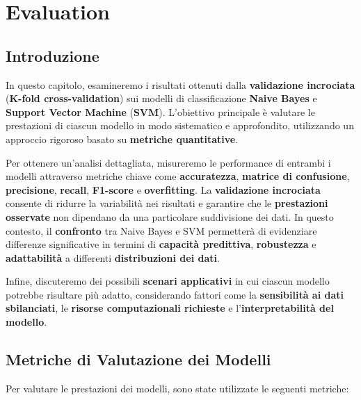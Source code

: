 \chapter{Evaluation}

\section{Introduzione}
In questo capitolo, esamineremo i risultati ottenuti dalla \textbf{validazione incrociata} (\textbf{K-fold cross-validation}) sui modelli di classificazione \textbf{Naive Bayes} e \textbf{Support Vector Machine} (\textbf{SVM}). L'obiettivo principale è valutare le prestazioni di ciascun modello in modo sistematico e approfondito, utilizzando un approccio rigoroso basato su \textbf{metriche quantitative}.

Per ottenere un'analisi dettagliata, misureremo le performance di entrambi i modelli attraverso metriche chiave come \textbf{accuratezza}, \textbf{matrice di confusione}, \textbf{precisione}, \textbf{recall}, \textbf{F1-score} e \textbf{overfitting}. La \textbf{validazione incrociata} consente di ridurre la variabilità nei risultati e garantire che le \textbf{prestazioni osservate} non dipendano da una particolare suddivisione dei dati. In questo contesto, il \textbf{confronto} tra Naive Bayes e SVM permetterà di evidenziare differenze significative in termini di \textbf{capacità predittiva}, \textbf{robustezza} e \textbf{adattabilità} a differenti \textbf{distribuzioni dei dati}.

Infine, discuteremo dei possibili \textbf{scenari applicativi} in cui ciascun modello potrebbe risultare più adatto, considerando fattori come la \textbf{sensibilità ai dati sbilanciati}, le \textbf{risorse computazionali richieste} e l'\textbf{interpretabilità del modello}.



\section{Metriche di Valutazione dei Modelli}
Per valutare le prestazioni dei modelli, sono state utilizzate le seguenti metriche:

